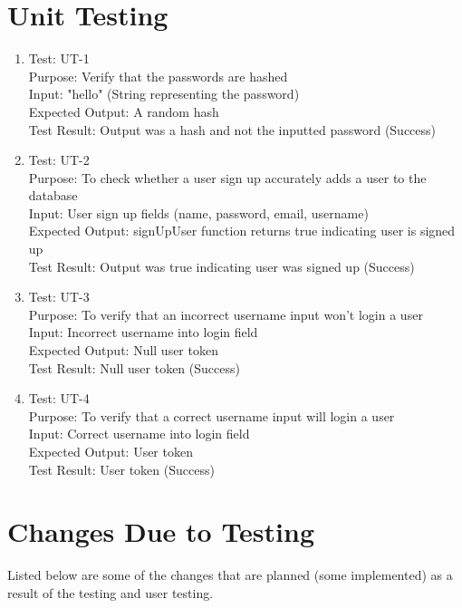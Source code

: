 \documentclass[12pt, titlepage]{article}
\begin{document}
\section{Unit Testing}
\begin{enumerate}
	\item Test: UT-1 \\
	Purpose: Verify that the passwords are hashed \\
	Input: "hello" (String representing the password)\\
	Expected Output: A random hash\\
	Test Result:  Output was a hash and not the inputted password (Success)\\

  \item Test: UT-2 \\
	Purpose: To check whether a user sign up accurately adds a user to the database\\
	Input: User sign up fields (name, password, email, username)\\
	Expected Output: signUpUser function returns true indicating user is signed up\\
	Test Result:  Output was true indicating user was signed up (Success)\\

  \item Test: UT-3 \\
	Purpose: To verify that an incorrect username input won't login a user \\
	Input: Incorrect username into login field \\
	Expected Output: Null user token\\
	Test Result: Null user token (Success)\\

  \item Test: UT-4 \\
	Purpose: To verify that a correct username input will login a user \\
	Input: Correct username into login field \\
	Expected Output: User token\\
	Test Result: User token (Success)\\
\end{enumerate}

\section{Changes Due to Testing}
Listed below are some of the changes that are planned (some implemented) as a result of the testing and user testing.
\end{document}
